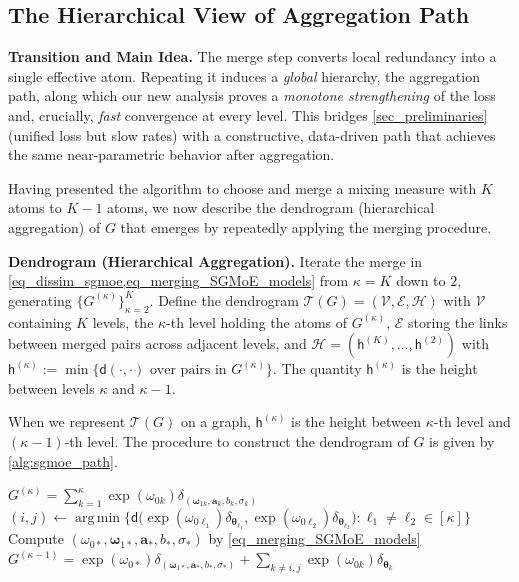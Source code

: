 \documentclass[twoside]{article}
\newcommand{\divclus}{\mathsf{d}}
\newcommand{\height}{\mathsf{h}}
\theoremstyle{plain}
\theoremstyle{definition}
\theoremstyle{plain}
\def\vtheta{{\bm{\theta}}}
\def\vomega{{\bm{\omega}}}
\def\va{{\bm{a}}}
\def\gE{{\mathcal{E}}}
\def\gH{{\mathcal{H}}}
\def\gV{{\mathcal{V}}}
\newcommand{\cT}{\mathcal{T}}
\DeclareMathOperator*{\argmin}{arg\,min}
\begin{document}
\subsection{The Hierarchical View of Aggregation Path}
\label{subsec_agg_path}

{\bf Transition and Main Idea.} The merge step converts local redundancy into a single effective atom. Repeating it induces a \emph{global} hierarchy, the aggregation path, along which our new analysis proves a \emph{monotone strengthening} of the loss and, crucially, \emph{fast} convergence at every level. This bridges \cref{sec_preliminaries} (unified loss but slow rates) with a constructive, data-driven path that achieves the same near-parametric behavior after aggregation.

Having presented the algorithm to choose and merge a mixing measure with $K$ atoms to $K-1$ atoms, we now describe the dendrogram (hierarchical aggregation) of $G$ that emerges by repeatedly applying the merging procedure.

{\bf Dendrogram (Hierarchical Aggregation).}
Iterate the merge in \cref{eq_dissim_sgmoe,eq_merging_SGMoE_models} from $\kappa=K$ down to $2$, generating $\{G^{(\kappa)}\}_{\kappa=2}^K$.
Define the dendrogram $\cT(G)=(\gV,\gE,\gH)$ with $\gV$ containing $K$ levels, the $\kappa$-th level holding the atoms of $G^{(\kappa)}$, $\gE$ storing the links between merged pairs across adjacent levels, and $\gH=(\height^{(K)},\dots,\height^{(2)})$ with
\(
\height^{(\kappa)}:=\min\{\divclus(\cdot,\cdot)\text{ over pairs in }G^{(\kappa)}\}.
\)
The quantity $\height^{(\kappa)}$ is the height between levels $\kappa$ and $\kappa-1$.

When we represent $\cT(G)$ on a graph, $\height^{(\kappa)}$ is the height between $\kappa$-th level and $(\kappa-1)$-th level. The procedure to construct the dendrogram of $G$ is given by \cref{alg:sgmoe_path}.


\begin{algorithm}[!ht]
\caption{SGMoE Merge Step (Fast-Rate-Aware)}
\label{alg:sgmoe_merge}
\begin{algorithmic}[1]
\Require $G^{(\kappa)}=\sum_{k=1}^{\kappa}\exp(\omega_{0k})\delta_{(\vomega_{1k},\va_k,b_k,\sigma_k)}$
\State $(i,j)\gets\argmin\{\divclus\big(\exp(\omega_{0\ell_1})\delta_{\vtheta_{\ell_1}},\exp(\omega_{0\ell_2})\delta_{\vtheta_{\ell_2}}\big): \ell_1\neq\ell_2\in[\kappa]\}$
\State Compute $(\omega_{0*},\vomega_{1*},\va_*,b_*,\sigma_*)$ by \cref{eq_merging_SGMoE_models}
\State \Return $G^{(\kappa-1)}=\exp(\omega_{0*})\delta_{(\vomega_{1*},\va_*,b_*,\sigma_*)}+\sum_{k\neq i,j}\exp(\omega_{0k})\delta_{\vtheta_k}$
\end{algorithmic}
\end{algorithm}
\end{document}
